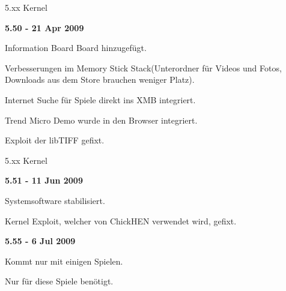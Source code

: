 \documentclass[mode=print,paper=screen,style=jefka]{powerdot}
\begin{document}
\begin{slide}{5.xx Kernel}
	\begin{large}\textbf{5.50 - 21 Apr 2009}\end{large}
	\begin{list}{-}{}
		\item{Information Board Board hinzugefügt.}
		\item{Verbesserungen im Memory Stick Stack(Unterordner für Videos und Fotos, Downloads aus dem Store brauchen weniger Platz).}
		\item{Internet Suche für Spiele direkt ins XMB integriert.}
		\item{Trend Micro Demo wurde in den Browser integriert.}
		\item{Exploit der libTIFF gefixt.} 
	\end{list}
\end{slide}

\begin{slide}{5.xx Kernel}
	\begin{large}\textbf{5.51 - 11 Jun 2009}\end{large}
	\begin{list}{-}{}
		\item{Systemsoftware stabilisiert.}
		\item{Kernel Exploit, welcher von ChickHEN verwendet wird, gefixt.} 
	\end{list}
	\begin{large}\textbf{5.55 - 6 Jul 2009}\end{large}
	\begin{list}{-}{}
		\item{Kommt nur mit einigen Spielen.}
		\item{Nur für diese Spiele benötigt.} 
	\end{list}
\end{slide}
\end{document}
